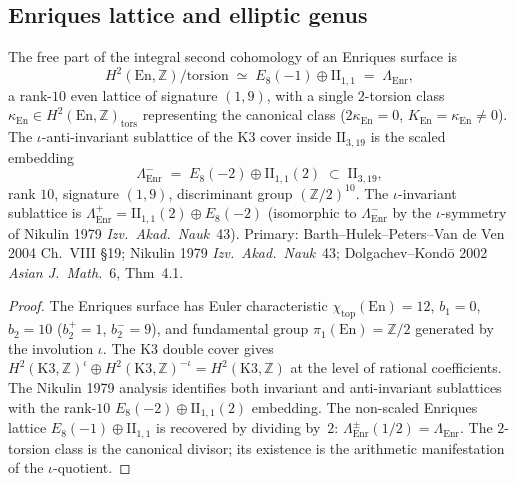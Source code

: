 \subsection{Enriques lattice and elliptic genus}
\label{subsec:bkm-enriques-lattice-genus}

\begin{proposition}
\label{prop:bkm-enriques-lattice}
The free part of the integral second cohomology of an Enriques
surface is
\[
 H^2(\mathrm{En},\mathbb{Z})/\mathrm{torsion}
 \;\simeq\;
 E_8(-1) \oplus \mathrm{II}_{1,1}
 \;=\;
 \Lambda_{\mathrm{Enr}},
\]
a rank-$10$ even lattice of signature $(1,9)$, with a single $2$-torsion
class $\kappa_{\mathrm{En}}\in H^2(\mathrm{En},\mathbb{Z})_{\mathrm{tors}}$
representing the canonical class ($2\kappa_{\mathrm{En}} = 0$,
$K_{\mathrm{En}} = \kappa_{\mathrm{En}}\ne 0$).
The $\iota$-anti-invariant sublattice of the K3 cover inside
$\mathrm{II}_{3,19}$ is the scaled embedding
\[
 \Lambda_{\mathrm{Enr}}^{-}
 \;=\;
 E_8(-2) \oplus \mathrm{II}_{1,1}(2)
 \;\subset\;
 \mathrm{II}_{3,19},
\]
rank $10$, signature $(1,9)$, discriminant group
$(\mathbb{Z}/2)^{10}$. The $\iota$-invariant sublattice is
$\Lambda_{\mathrm{Enr}}^{+} = \mathrm{II}_{1,1}(2) \oplus E_8(-2)$
(isomorphic to $\Lambda_{\mathrm{Enr}}^{-}$ by the $\iota$-symmetry
of Nikulin 1979 \emph{Izv.~Akad.~Nauk}~43).
Primary: Barth--Hulek--Peters--Van de Ven 2004 Ch.~VIII \S19;
Nikulin 1979 \emph{Izv.~Akad.~Nauk}~43;
Dolgachev--Kond\={o} 2002 \emph{Asian J.~Math.}~6, Thm~4.1.
\end{proposition}

\begin{proof}[Proof]
The Enriques surface has Euler characteristic
$\chi_{\mathrm{top}}(\mathrm{En}) = 12$, $b_1 = 0$, $b_2 = 10$
($b_2^+ = 1$, $b_2^- = 9$), and fundamental group
$\pi_1(\mathrm{En}) = \mathbb{Z}/2$ generated by the involution
$\iota$. The K3 double cover gives
$H^2(\mathrm{K3},\mathbb{Z})^{\iota} \oplus
H^2(\mathrm{K3},\mathbb{Z})^{-\iota} = H^2(\mathrm{K3},\mathbb{Z})$
at the level of rational coefficients. The Nikulin 1979 analysis
identifies both invariant and anti-invariant sublattices with the
rank-$10$ $E_8(-2)\oplus\mathrm{II}_{1,1}(2)$ embedding. The
non-scaled Enriques lattice $E_8(-1)\oplus\mathrm{II}_{1,1}$ is
recovered by dividing by~$2$: $\Lambda_{\mathrm{Enr}}^{\pm}(1/2) =
\Lambda_{\mathrm{Enr}}$. The $2$-torsion class is the canonical
divisor; its existence is the arithmetic manifestation of the
$\iota$-quotient.
\end{proof}


